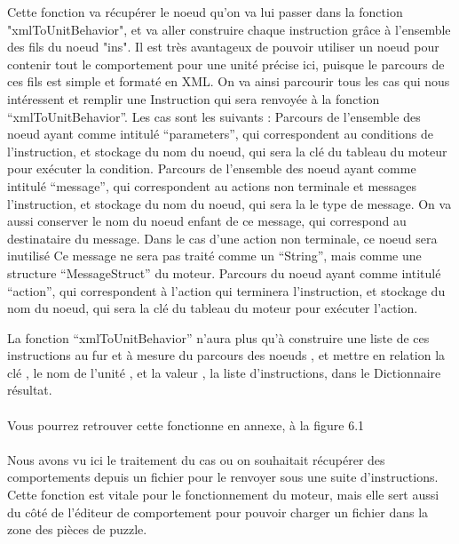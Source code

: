 \documentclass{report}
\begin{document}
Cette fonction va récupérer le noeud qu'on va lui passer dans la fonction "xmlToUnitBehavior", et va aller construire chaque instruction grâce à l'ensemble des fils du noeud "ins".
Il est très avantageux de pouvoir utiliser un noeud pour contenir tout le comportement pour une unité précise ici, puisque le parcours de ces fils est simple et formaté en XML. 
On va ainsi parcourir tous les cas qui nous intéressent  et remplir une Instruction qui sera renvoyée à la fonction “xmlToUnitBehavior”.
Les cas sont les suivants :\newline
Parcours de l’ensemble des noeud ayant comme intitulé “parameters”, qui correspondent au conditions de l’instruction, et stockage du nom du noeud, qui sera la clé du tableau du moteur pour exécuter la condition.\newline
Parcours de l’ensemble des noeud ayant comme intitulé “message”, qui correspondent au actions non terminale et messages l’instruction, et stockage du nom du noeud, qui sera la le type de message. On va aussi conserver le nom du noeud enfant de ce message, qui correspond au destinataire du message. Dans le cas d’une action non terminale, ce noeud sera inutilisé\newline
Ce message ne sera pas traité comme un “String”, mais comme une structure “MessageStruct” du moteur.\newline
Parcours du noeud ayant comme intitulé “action”, qui correspondent à l’action qui terminera l’instruction, et stockage du nom du noeud, qui sera la clé du tableau du moteur pour exécuter l’action.\newline

 La fonction “xmlToUnitBehavior” n’aura plus qu'à construire une liste de ces instructions au fur et à mesure du parcours des noeuds , et mettre en relation la clé , le nom de l’unité , et la valeur , la liste d’instructions, dans le Dictionnaire résultat.
\paragraph{}
Vous pourrez retrouver cette fonctionne en annexe, à la figure 6.1
\paragraph{}
Nous avons vu ici le traitement du cas ou on souhaitait récupérer des comportements depuis un fichier pour le renvoyer sous une suite d’instructions. Cette fonction est vitale pour le fonctionnement du moteur, mais elle sert aussi du côté de l’éditeur de comportement pour pouvoir charger un fichier dans la zone des pièces de puzzle.
\end{document}
